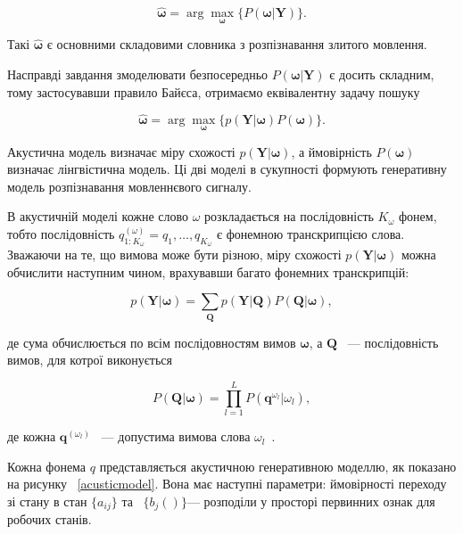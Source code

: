 \documentclass{diploma}
\begin{document}
\begin{equation}
\label{eq:1}
\boldsymbol{\hat{\omega}} = \arg \max_{\boldsymbol\omega}\{P(\boldsymbol\omega|\boldsymbol Y)\}. 
\end{equation}

Такі $\boldsymbol{\hat{\omega}}$ є основними складовими словника з розпізнавання злитого мовлення.

Насправді завдання змоделювати безпосередньо $P(\boldsymbol\omega|\boldsymbol Y)$ є досить складним, тому застосувавши правило Байєса, отримаємо еквівалентну задачу пошуку 

\begin{equation}
\label{eq:2}
\boldsymbol{\hat{\omega}} = \arg \max_{\boldsymbol\omega}\{p(\boldsymbol Y|\boldsymbol\omega)P(\boldsymbol\omega)\}.
\end{equation}

Акустична модель визначає міру схожості $p(\boldsymbol Y|\boldsymbol\omega)$, а ймовірність $P(\boldsymbol\omega)$ визначає лінгвістична модель. Ці дві моделі в сукупності формують генеративну модель розпізнавання мовленнєвого сигналу.

В акустичній моделі кожне слово $\omega$ розкладається на послідовність $K_\omega$ фонем, тобто послідовність $q^{(\omega)}_{1:K_\omega} = q_1,\dots,q_{K_\omega}$ є фонемною транскрипцією слова. Зважаючи на те, що вимова може бути різною, міру схожості $p(\boldsymbol Y|\boldsymbol\omega)$ можна обчислити наступним чином, врахувавши багато фонемних транскрипцій:
 
\begin{equation}
\label{eq:3}
p(\boldsymbol Y|\boldsymbol\omega) = \sum_{\boldsymbol Q} p(\boldsymbol Y|\boldsymbol Q)P(\boldsymbol Q|\boldsymbol\omega),
\end{equation} 

де сума обчислюється по всім послідовностям вимов $\boldsymbol\omega$, а $\boldsymbol Q$ ~--- послідовність вимов, для котрої виконується 

\begin{equation}
\label{eq:4}
P(\boldsymbol Q|\boldsymbol\omega) = \prod_{l=1}^L P(\boldsymbol q^{\omega_l}|\omega_l), 
\end{equation} 

де кожна $\boldsymbol q^{(\omega_l)}$ ~--- допустима вимова слова $\omega_l$~.\cite{l1}

Кожна фонема $q$ представляється акустичною генеративною моделлю, як показано на рисунку ~\ref{acusticmodel}. Вона має наступні параметри: ймовірності переходу зі стану в стан $\{a_{ij}\}$ та ~$\{b_j()\}$--- розподіли у просторі первинних ознак для робочих станів. 
\end{document}
